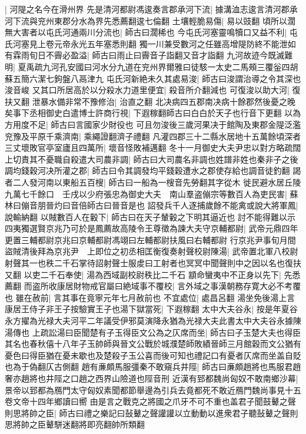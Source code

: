 |{
	河隄之名今在滑州界}
先是清河都尉馮逡奏言郡承河下流|{
	據溝洫志逡言清河郡承河下流與兖州東郡分水為界先悉薦翻逡七倫翻}
土壤輕脆易傷|{
	易以豉翻}
頃所以濶無大害者以屯氏河通兩川分流也|{
	師古曰濶稀也}
今屯氏河塞靈鳴犢口又益不利|{
	屯氏河塞見上卷元帝永光五年塞悉則翻}
獨一川兼受數河之任雖高增隄防終不能泄如有霖雨旬日不霽必盈溢|{
	師古曰雨止曰霽音子詣翻又音才詣翻}
九河故迹今既滅難明|{
	夏禹疏九河孔安國曰河水分九道在兖州界爾雅曰徒駭一太史二馬頰三覆釡四胡蘇五簡六潔七鉤盤八鬲津九}
屯氏河新絶未久其處易浚|{
	師古曰浚謂治導之令其深也浚音峻}
又其口所居高於以分殺水力道里便宜|{
	殺音所介翻減也}
可復浚以助大河|{
	復扶又翻}
泄暴水備非常不豫修治|{
	治直之翻}
北决病四五郡南决病十餘郡然後憂之晚矣事下丞相御史白遣博士許商行視|{
	下遐稼翻師古曰白白於天子也行音下更翻}
以為方用度不足|{
	師古曰言國家少財役也}
可且勿浚後三歲河果决于館陶及東郡金隄泛濫兖豫及平原千乘濟南|{
	乘繩證翻濟子禮翻}
凡灌四郡三十二縣水居地十五萬餘頃深者三丈壞敗官亭室廬且四萬所|{
	壞音怪敗補邁翻}
冬十一月御史大夫尹忠以對方略疏闊上切責其不憂職自殺遣大司農非調|{
	師古曰大司農名非調也姓譜非姓也秦非子之後}
調均錢穀河决所灌之郡|{
	師古曰令其調發均平錢穀遭水之郡使存給也調音徒釣翻}
謁者二人發河南以東船五百㮴|{
	師古曰一船為一㮴音先勞翻其字從木}
徙民避水居丘陵九萬七千餘口　壬戌以少府張忠為御史大夫　南山羣盗傰宗等數百人為吏民害|{
	蘇林曰傰音朋晉灼曰音倍師古曰晉音是也}
詔發兵千人逐捕歲餘不能禽或說大將軍鳳|{
	說輸納翻}
以賊數百人在轂下|{
	師古曰在天子輦轂之下明其逼近也}
討不能得難以示四夷獨選賢京兆乃可於是鳳薦故高陵令王尊徵為諫大夫守京輔都尉|{
	武帝元鼎四年更置三輔都尉京兆曰京輔都尉馮翊曰左輔都尉扶風曰右輔都尉}
行京兆尹事旬月間盜賊清後拜為京兆尹　上即位之初丞相匡衡復奏射聲校尉陳湯|{
	武帝置北軍八校尉射聲其一也秩二千石掌待詔射聲士服䖍曰工射者也冥冥中聞聲則中之因以名也復扶又翻}
以吏二千石奉使|{
	湯為西域副校尉秩比二千石}
顓命蠻夷中不正身以先下|{
	先悉薦翻}
而盗所收康居財物戒官屬曰絶域事不覆校|{
	言外域之事漢朝務存寛大必不考覆也}
雖在赦前|{
	言其事在竟寧元年七月赦前也}
不宜處位|{
	處昌呂翻}
湯坐免後湯上言康居王侍子非王子按驗實王子也湯下獄當死|{
	下遐稼翻}
太中大夫谷永|{
	按是年夏谷永方擢為光禄大夫河平二年議受伊邪莫演降永猶為光禄大夫此書太中大夫谷永據陳湯傳也}
上疏訟湯曰臣聞楚有子玉得臣文公為之仄席而坐|{
	師古曰子玉楚大夫也得臣其名也春秋僖十八年子玉帥師與晉文公戰於城濮楚師敗績晉師三月館穀而文公猶有憂色曰得臣猶在憂未歇也及楚殺子玉公喜而後可知也禮記口有憂者仄席而坐盖自貶也為于偽翻仄古側翻}
趙有亷頗馬服彊秦不敢窺兵井陘|{
	師古曰亷頗趙將也馬服君趙奢亦趙將也井陘之口趙之西界山險道也陘音刑}
近漢有郅都魏尚匈奴不敢南鄉沙幕|{
	景帝以郅都為鴈門太守匈奴素聞都節舉邊為引兵去竟都死不敢近鴈門魏尚事見十五卷文帝十四年鄉讀曰嚮}
由是言之戰克之將國之爪牙不可不重也盖君子聞鼓鼙之聲則思將帥之臣|{
	師古曰禮之樂記曰鼔鼙之聲讙讙以立動動以進衆君子聽鼔鼙之聲則思將帥之臣鼙駢迷翻將即亮翻帥所類翻}
